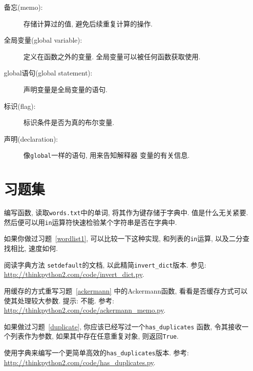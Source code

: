 \documentclass[10pt]{book}
\begin{document}
\begin{description}
\item[备忘(memo):] 存储计算过的值, 避免后续重复计算的操作. 

\item[全局变量(global variable):] 定义在函数之外的变量. 
全局变量可以被任何函数获取使用. 

\item[global语句(global statement):] 声明变量是全局变量的语句.

\item[标识(flag):] 标识条件是否为真的布尔变量. 

\item[声明(declaration):] 像{\tt global}一样的语句, 用来告知解释器
变量的有关信息. 

\end{description}


\section{习题集}

\begin{exercise}
\label{wordlist2}

编写函数, 读取{\tt words.txt}中的单词, 
将其作为键存储于字典中. 值是什么无关紧要. 
然后便可以用{\tt in}运算符快速检验某个字符串是否在字典中. 

如果你做过习题~\ref{wordlist1}, 可以比较一下这种实现, 和列表的{\tt in}运算, 
以及二分查找相比, 速度如何. 

\end{exercise}


\begin{exercise}
\label{setdefault}
阅读字典方法 {\tt setdefault}的文档, 
以此精简\verb"invert_dict"版本. 
参见: \url{http://thinkpython2.com/code/invert_dict.py}.

\end{exercise}


\begin{exercise}
用缓存的方式重写习题~\ref{ackermann} 中的Ackermann函数, 
看看是否缓存方式可以使其处理较大参数. 
提示: 不能.
参考: \url{http://thinkpython2.com/code/ackermann_memo.py}.

\end{exercise}


\begin{exercise}
如果做过习题~\ref{duplicate}, 你应该已经写过一个\verb"has_duplicates" 函数, 
令其接收一个列表作为参数, 如果其中存在任意重复对象, 则返回{\tt True}.

使用字典来编写一个更简单高效的\verb"has_duplicates"版本. 
参考: \url{http://thinkpython2.com/code/has_duplicates.py}.
\end{exercise}
\end{document}
